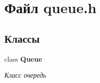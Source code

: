\section{Файл queue.\+h}
\label{queue_8h}
\subsection*{Классы}
\begin{DoxyCompactItemize}
\item 
class {\bf Queue}
\begin{DoxyCompactList}\small\item\em Класс очередь \end{DoxyCompactList}\end{DoxyCompactItemize}
